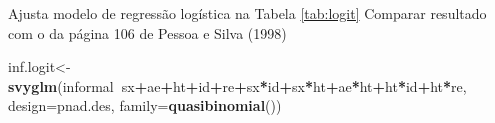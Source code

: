 \documentclass[]{book}
\newenvironment{Shaded}{\begin{snugshade}}{\end{snugshade}}
\newcommand{\KeywordTok}[1]{\textcolor[rgb]{0.13,0.29,0.53}{\textbf{#1}}}
\newcommand{\DataTypeTok}[1]{\textcolor[rgb]{0.13,0.29,0.53}{#1}}
\newcommand{\DecValTok}[1]{\textcolor[rgb]{0.00,0.00,0.81}{#1}}
\newcommand{\OtherTok}[1]{\textcolor[rgb]{0.56,0.35,0.01}{#1}}
\newcommand{\OperatorTok}[1]{\textcolor[rgb]{0.81,0.36,0.00}{\textbf{#1}}}
\newcommand{\NormalTok}[1]{#1}
\theoremstyle{definition}
\theoremstyle{definition}
\theoremstyle{definition}
\theoremstyle{remark}
\begin{document}
Ajusta modelo de regressão logística na Tabela \ref{tab:logit} Comparar
resultado com o da página 106 de Pessoa e Silva (1998)

\begin{Shaded}
\begin{Highlighting}[]
\NormalTok{inf.logit<-}\KeywordTok{svyglm}\NormalTok{(informal}\OperatorTok{~}\NormalTok{sx}\OperatorTok{+}\NormalTok{ae}\OperatorTok{+}\NormalTok{ht}\OperatorTok{+}\NormalTok{id}\OperatorTok{+}\NormalTok{re}\OperatorTok{+}\NormalTok{sx}\OperatorTok{*}\NormalTok{id}\OperatorTok{+}\NormalTok{sx}\OperatorTok{*}\NormalTok{ht}\OperatorTok{+}\NormalTok{ae}\OperatorTok{*}\NormalTok{ht}\OperatorTok{+}\NormalTok{ht}\OperatorTok{*}\NormalTok{id}\OperatorTok{+}\NormalTok{ht}\OperatorTok{*}\NormalTok{re,}
  \DataTypeTok{design=}\NormalTok{pnad.des, }\DataTypeTok{family=}\KeywordTok{quasibinomial}\NormalTok{())}
\end{Highlighting}
\end{Shaded}

\begin{Shaded}
\end{Shaded}
\end{document}
